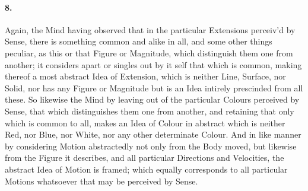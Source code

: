 \documentclass[]{article}
\newenvironment{sectionbody}{\begin{multicols}{2}}{\end{multicols}}
\begin{document}
\begin{sectionbody}
\paragraph{8.} Again, the Mind having observed that in the particular Extensions
perceiv'd by Sense, there is something common and alike in all,
and some other things peculiar, as this or that Figure or
Magnitude, which distinguish them one from another; it considers
apart or singles out by it self that which is common, making
thereof a most abstract Idea of Extension, which is neither Line,
Surface, nor Solid, nor has any Figure or Magnitude but is an
Idea intirely prescinded from all these.  So likewise the Mind by
leaving out of the particular Colours perceived by Sense, that
which distinguishes them one from another, and retaining that
only which is common to all, makes an Idea of Colour in abstract
which is neither Red, nor Blue, nor White, nor any other
determinate Colour.  And in like manner by considering Motion
abstractedly not only from the Body moved, but likewise from the
Figure it describes, and all particular Directions and
Velocities, the abstract Idea of Motion is framed; which equally
corresponds to all particular Motions whatsoever that may be
perceived by Sense.




\end{sectionbody}
\end{document}
